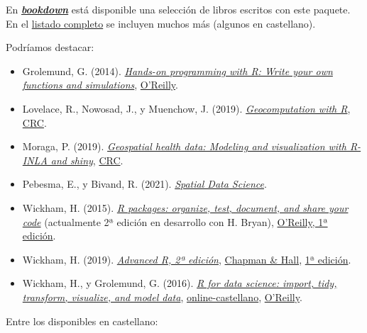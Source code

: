 \documentclass[
]{book}
\theoremstyle{break}
\theoremstyle{definition}
\theoremstyle{definition}
\theoremstyle{definition}
\theoremstyle{definition}
\theoremstyle{remark}
\begin{document}
En \href{https://bookdown.org}{\textbf{\emph{bookdown}}} está disponible una selección de libros escritos con este paquete.
En el \href{(https://bookdown.org/home/archive/)}{listado completo} se incluyen muchos más (algunos en castellano).

Podríamos destacar:

\begin{itemize}
\item
  Grolemund, G. (2014). \emph{\href{https://rstudio-education.github.io/hopr}{Hands-on programming with R: Write your own functions and simulations}}, \href{http://shop.oreilly.com/product/0636920028574.do}{O'Reilly}.
\item
  Lovelace, R., Nowosad, J., y Muenchow, J. (2019). \emph{\href{https://geocompr.robinlovelace.net}{Geocomputation with R}}, \href{https://www.routledge.com/9781138304512}{CRC}.
\item
  Moraga, P. (2019). \emph{\href{https://www.paulamoraga.com/book-geospatial}{Geospatial health data: Modeling and visualization with R-INLA and shiny}}, \href{https://www.routledge.com/9780367357955}{CRC}.
\item
  Pebesma, E., y Bivand, R. (2021). \emph{\href{https://r-spatial.org/book}{Spatial Data Science}}.
\item
  Wickham, H. (2015). \emph{\href{http://r-pkgs.had.co.nz/}{R packages: organize, test, document, and share your code}} (actualmente 2ª edición en desarrollo con H. Bryan), \href{http://shop.oreilly.com/product/0636920034421.do}{O'Reilly, 1ª edición}.
\item
  Wickham, H. (2019). \emph{\href{https://adv-r.hadley.nz/}{Advanced R, 2ª edición}}, \href{https://www.amazon.com/dp/0815384572}{Chapman \& Hall}, \href{http://adv-r.had.co.nz/}{1ª edición}.
\item
  Wickham, H., y Grolemund, G. (2016). \emph{\href{http://r4ds.had.co.nz}{R for data science: import, tidy, transform, visualize, and model data}}, \href{https://es.r4ds.hadley.nz}{online-castellano}, \href{http://shop.oreilly.com/product/0636920034407.do}{O'Reilly}.
\end{itemize}

Entre los disponibles en castellano:
\end{document}
